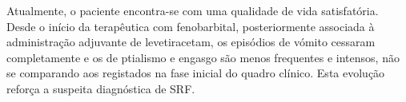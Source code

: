 Atualmente, o paciente encontra-se com uma qualidade de vida satisfatória. Desde o início da terapêutica com fenobarbital, posteriormente associada à administração adjuvante de levetiracetam, os episódios de vómito cessaram completamente e os de ptialismo e engasgo são menos frequentes e intensos, não se comparando aos registados na fase inicial do quadro clínico. Esta evolução reforça a suspeita diagnóstica de SRF.











 































